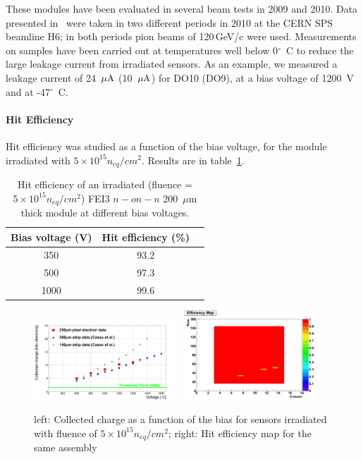 These modules have been evaluated in several beam tests in 2009 and 2010.
Data presented in~\cite{1748-0221-7-10-P10028}  were taken in two different periods in 2010 at the CERN 
SPS beamline H6; in both periods pion beams of 120\,GeV/c were used.
Measurements on  samples have been carried out at temperatures well
below 0$^{\circ}$~C to reduce the large leakage current from irradiated
sensors. As an example, we measured a leakage current of 24~${\rm \mu A}$
 (10~${\rm \mu A}$) for DO10 (DO9), at a bias voltage of 1200~V and at
 -47$^{\circ}$~C.

\paragraph{Hit Efficiency}

Hit efficiency was studied as a function of the bias voltage, for the
module irradiated with $5\times 10^{15} n_{eq}/cm^{2}$.
Results are in table~\ref{tab:n-eff}.

\begin{table}[!htb]
\caption{\label{tab:n-eff}Hit efficiency of an irradiated (fluence = $5\times 10^{15} n_{eq}/cm^{2}$)
FEI3 $n-on-n$ 200~$\mu$m thick module at different bias voltages.}
\begin{center}
\begin{tabular}{|c|c|c|}
\hline
Bias voltage (V) & Hit efficiency (\%) \\
\hline
350 & 93.2 \\
\hline
500 & 97.3 \\
\hline
1000 & 99.6 \\
\hline
\end{tabular}
\end{center}

\end{table}

\begin{figure}[!htb]
\begin{center}
\includegraphics[width=0.49\textwidth]{5E15_onlyElectrons.png}
\includegraphics[width=0.44\textwidth]{EffMap_DO13_1000V.png}
\end{center}
\caption{\label{fig:5e15}left: Collected charge as a function of the bias for sensors irradiated
with fluence of $5\times 10^{15} n_{eq}/cm^{2}$; right: Hit efficiency map for the same assembly}
\end{figure}

